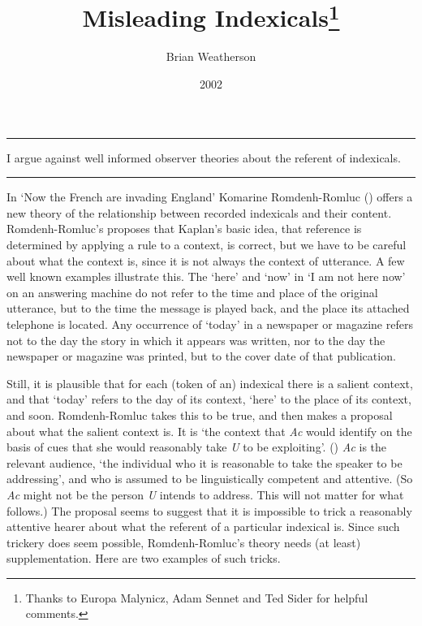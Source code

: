 \documentclass[
  10pt,
  letterpaper,
  DIV=11,
  numbers=noendperiod,
  twoside]{scrartcl}
\title{Misleading Indexicals\thanks{Thanks to Europa Malynicz, Adam
Sennet and Ted Sider for helpful comments.}}
\author{Brian Weatherson}
\date{2002}
\renewenvironment{abstract}
 {\vspace{-1.25cm}
 \quotation\small\noindent\rule{\linewidth}{.5pt}\par\smallskip
 \noindent }
 {\par\noindent\rule{\linewidth}{.5pt}\endquotation}
\begin{document}
\maketitle
\begin{abstract}
I argue against well informed observer theories about the referent of
indexicals.
\end{abstract}

In `Now the French are invading England' Komarine Romdenh-Romluc
() offers a new theory of the relationship
between recorded indexicals and their content. Romdenh-Romluc's proposes
that Kaplan's basic idea, that reference is determined by applying a
rule to a context, is correct, but we have to be careful about what the
context is, since it is not always the context of utterance. A few well
known examples illustrate this. The `here' and `now' in `I am not here
now' on an answering machine do not refer to the time and place of the
original utterance, but to the time the message is played back, and the
place its attached telephone is located. Any occurrence of `today' in a
newspaper or magazine refers not to the day the story in which it
appears was written, nor to the day the newspaper or magazine was
printed, but to the cover date of that publication.

Still, it is plausible that for each (token of an) indexical there is a
salient context, and that `today' refers to the day of its context,
`here' to the place of its context, and soon. Romdenh-Romluc takes this
to be true, and then makes a proposal about what the salient context is.
It is `the context that \emph{Ac} would identify on the basis of cues
that she would reasonably take \emph{U} to be exploiting'.
() \emph{Ac} is the relevant audience,
`the individual who it is reasonable to take the speaker to be
addressing', and who is assumed to be linguistically competent and
attentive. (So \emph{Ac} might not be the person \emph{U} intends to
address. This will not matter for what follows.) The proposal seems to
suggest that it is impossible to trick a reasonably attentive hearer
about what the referent of a particular indexical is. Since such
trickery does seem possible, Romdenh-Romluc's theory needs (at least)
supplementation. Here are two examples of such tricks.
\end{document}
